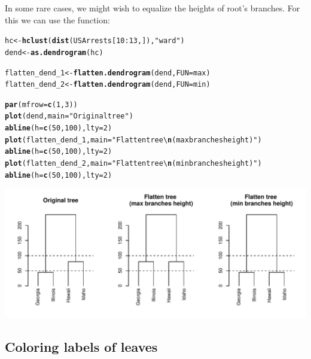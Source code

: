\documentclass[shortnames,nojss,article]{jss}\usepackage{graphicx, color}
\makeatletter
\def\maxwidth{ %
  \ifdim\Gin@nat@width>\linewidth
    \linewidth
  \else
    \Gin@nat@width
  \fi
}
\newcommand{\hlfunctioncall}[1]{\textcolor[rgb]{0.501960784313725,0,0.329411764705882}{\textbf{#1}}}%
\newcommand{\hlstring}[1]{\textcolor[rgb]{0.6,0.6,1}{#1}}%
\newenvironment{kframe}{%
 \def\at@end@of@kframe{}%
 \ifinner\ifhmode%
  \def\at@end@of@kframe{\end{minipage}}%
  \begin{minipage}{\columnwidth}%
 \fi\fi%
 \def\FrameCommand##1{\hskip\@totalleftmargin \hskip-\fboxsep
 \colorbox{shadecolor}{##1}\hskip-\fboxsep
     \hskip-\linewidth \hskip-\@totalleftmargin \hskip\columnwidth}%
 \MakeFramed {\advance\hsize-\width
   \@totalleftmargin\z@ \linewidth\hsize
   \@setminipage}}%
 {\par\unskip\endMakeFramed%
 \at@end@of@kframe}
\newenvironment{knitrout}{}{} %
\makeatother
\begin{document}
In some rare cases, we might wish to equalize the heights of root's branches. For this we can use the  function:


\begin{knitrout}
\color{fgcolor}\begin{kframe}
\begin{alltt}

hc <- \hlfunctioncall{hclust}(\hlfunctioncall{dist}(USArrests[10:13, ]), \hlstring{"ward"})
dend <- \hlfunctioncall{as.dendrogram}(hc)

flatten_dend_1 <- \hlfunctioncall{flatten.dendrogram}(dend, FUN = max)
flatten_dend_2 <- \hlfunctioncall{flatten.dendrogram}(dend, FUN = min)

\hlfunctioncall{par}(mfrow = \hlfunctioncall{c}(1, 3))
\hlfunctioncall{plot}(dend, main = \hlstring{"Original tree"})
\hlfunctioncall{abline}(h = \hlfunctioncall{c}(50, 100), lty = 2)
\hlfunctioncall{plot}(flatten_dend_1, main = \hlstring{"Flatten tree \textbackslash{}\hlfunctioncall{n}(max branches height)"})
\hlfunctioncall{abline}(h = \hlfunctioncall{c}(50, 100), lty = 2)
\hlfunctioncall{plot}(flatten_dend_2, main = \hlstring{"Flatten tree \textbackslash{}\hlfunctioncall{n}(min branches height)"})
\hlfunctioncall{abline}(h = \hlfunctioncall{c}(50, 100), lty = 2)
\end{alltt}
\end{kframe}

{\centering \includegraphics[width=\maxwidth]{figure/unnamed-chunk-25} 

}



\end{knitrout}





\subsection{Coloring labels of leaves}
\end{document}
